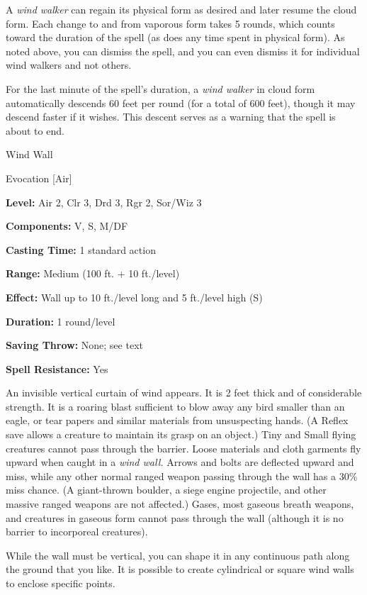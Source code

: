 \documentclass{article}
\begin{document}
A \textit{wind walker }can regain its physical form as desired and later resume 
the cloud form. Each change to and from vaporous form takes 5 rounds, which counts 
toward the duration of the spell (as does any time spent in physical form). As 
noted above, you can dismiss the spell, and you can even dismiss it for individual 
wind walkers and not others.

For the last minute of the spell's duration, a \textit{wind walker }in cloud form 
automatically descends 60 feet per round (for a total of 600 feet), though it may 
descend faster if it wishes. This descent serves as a warning that the spell is 
about to end.

\vspace{12pt}
Wind Wall

Evocation [Air]

\textbf{Level:} Air 2, Clr 3, Drd 3, Rgr 2, Sor/Wiz 3

\textbf{Components:} V, S, M/DF

\textbf{Casting Time:} 1 standard action

\textbf{Range: }Medium (100 ft. + 10 ft./level)

\textbf{Effect: }Wall up to 10 ft./level long and 5 ft./level high (S)

\textbf{Duration:} 1 round/level

\textbf{Saving Throw:} None; see text

\textbf{Spell Resistance:} Yes

An invisible vertical curtain of wind appears. It is 2 feet thick and of considerable 
strength. It is a roaring blast sufficient to blow away any bird smaller than an 
eagle, or tear papers and similar materials from unsuspecting hands. (A Reflex 
save allows a creature to maintain its grasp on an object.) Tiny and Small flying 
creatures cannot pass through the barrier. Loose materials and cloth garments fly 
upward when caught in a \textit{wind wall. }Arrows and bolts are deflected upward 
and miss, while any other normal ranged weapon passing through the wall has a 30\% 
miss chance. (A giant-thrown boulder, a siege engine projectile, and other massive 
ranged weapons are not affected.) Gases, most gaseous breath weapons, and creatures 
in gaseous form cannot pass through the wall (although it is no barrier to incorporeal 
creatures).

While the wall must be vertical, you can shape it in any continuous path along 
the ground that you like. It is possible to create cylindrical or square wind walls 
to enclose specific points. 
\end{document}
